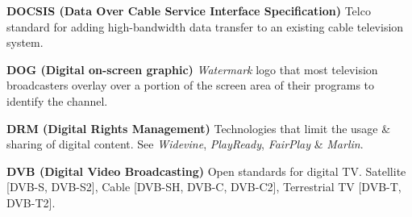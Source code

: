 \smallskip
\textbf{DOCSIS (Data Over Cable Service Interface Specification)}
Telco standard for adding high-bandwidth data transfer to an existing cable television system.

\smallskip
\textbf{DOG (Digital on-screen graphic)}
\textit{Watermark} logo that most television broadcasters overlay over a portion of the screen area of their programs to identify the channel.

\smallskip
\textbf{DRM (Digital Rights Management)}
Technologies that limit the usage \& sharing of digital content.  See \textit{Widevine}, \textit{PlayReady}, \textit{FairPlay} \& \textit{Marlin}.

\smallskip
\textbf{DVB (Digital Video Broadcasting)}
Open standards for digital TV.  Satellite [DVB-S, DVB-S2], Cable [DVB-SH, DVB-C, DVB-C2], Terrestrial TV [DVB-T, DVB-T2].
